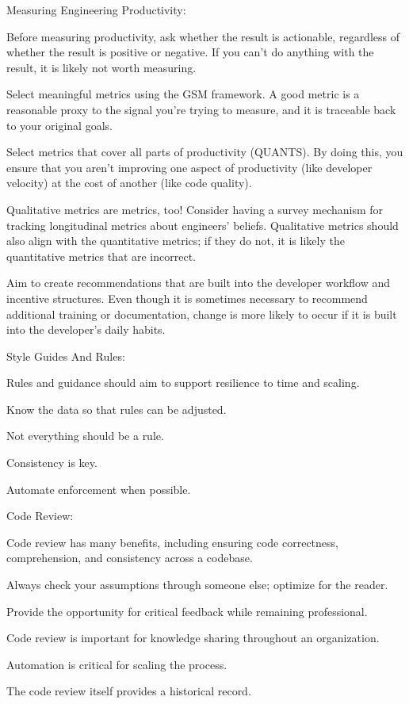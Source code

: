 Measuring Engineering Productivity:
\bit
\item Before measuring productivity, ask whether the result is actionable, regardless of whether the result is positive
or negative. If you can't do anything with the result, it is likely not worth measuring.
\item Select meaningful metrics using the GSM framework. A good metric is a reasonable proxy to the signal you're trying
to measure, and it is traceable back to your original goals.
\item Select metrics that cover all parts of productivity (QUANTS). By doing this, you ensure that you aren't improving
one aspect of productivity (like developer velocity) at the cost of another (like code quality).
\item Qualitative metrics are metrics, too! Consider having a survey mechanism for tracking longitudinal metrics about
engineers' beliefs. Qualitative metrics should also align with the quantitative metrics; if they do not, it is likely
the quantitative metrics that are incorrect.
\item Aim to create recommendations that are built into the developer workflow and incentive structures. Even though it
is sometimes necessary to recommend additional training or documentation, change is more likely to occur if it is built
into the developer's daily habits.
\eit

Style Guides And Rules:
\bit
\item Rules and guidance should aim to support resilience to time and scaling.
\item Know the data so that rules can be adjusted.
\item Not everything should be a rule.
\item Consistency is key.
\item Automate enforcement when possible.
\eit

Code Review:
\bit
\item Code review has many benefits, including ensuring code correctness, comprehension, and consistency across a
codebase.
\item Always check your assumptions through someone else; optimize for the reader.
\item Provide the opportunity for critical feedback while remaining professional.
\item Code review is important for knowledge sharing throughout an organization.
\item Automation is critical for scaling the process.
\item The code review itself provides a historical record.
\eit


